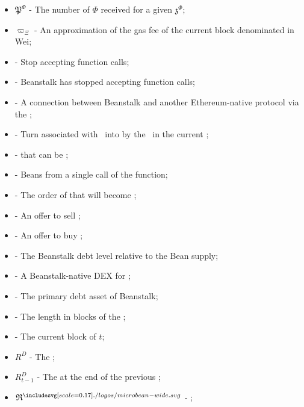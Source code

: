 \documentclass[class=article, crop=false]{standalone}
\begin{document}
\begin{itemize}[topsep=0pt, itemsep=3pt,leftmargin=16pt]
    \item[] $\mathfrak{P}^{\Phi}$ - \hypertarget{ht143}{The number of $\Phi$ received for  a given $\mathfrak{z}^{\Phi}$};
    \item[] $\varpi_\Xi$ - An approximation of the gas fee of the current block denominated in Wei;
    \item[]  - \hypertarget{ht144}{Stop accepting  function calls};
    \item[]  - \hypertarget{ht145}{Beanstalk has stopped accepting  function calls};
    \item[]  - \hypertarget{ht146}{A connection between Beanstalk and another Ethereum-native protocol via the };
    \item[]  - \hypertarget{ht147}{Turn  associated with  \Bean\ into  by  the  \Bean\ in the current };
    \item[]  - \hypertarget{ht148}{ that can be };
    \item[]  - \hypertarget{ht149}{Beans  from a single call of the  function};
    \item[]  - \hypertarget{ht150}{The order of  that will become };
    \item[]  - \hypertarget{ht151}{An offer to sell };
    \item[]  - \hypertarget{ht152}{An offer to buy };
    \item[]  - \hypertarget{ht153}{The Beanstalk debt level relative to the Bean supply};
    \item[]  - \hypertarget{ht154}{A Beanstalk-native DEX for };
    \item[]  - \hypertarget{ht155}{The primary debt asset of Beanstalk};
    \item[]  - The length in blocks of the ;
    \item[]  - The current block of $t$;
    \item[] $R^D$ - \hypertarget{ht156}{The };
    \item[] $R^D_{t-1}$ - \hypertarget{ht157}{The  at the end of the previous };
    \item[] $\mathfrak{R}^{\bean}$ - \hypertarget{ht158}{ \Bean};

\end{itemize}
\end{document}
